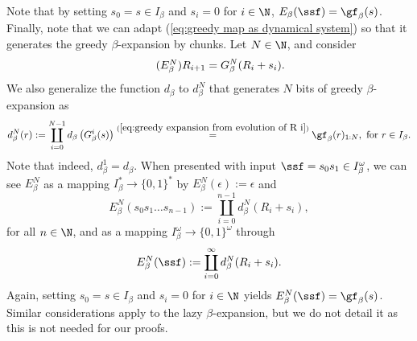 Note that by setting $s_0 = s \in I_\beta$ and $s_i = 0$ for $i \in \N$, $E_\beta(\ssf) = \gf_\beta(s)$. Finally, note that we can adapt (\ref{eq:greedy map as dynamical system}) so that it generates the greedy $\beta$-expansion by chunks. Let $N \in \N$, and consider 
\begin{equation}\label{eq:greedy map chunks as dynamical system} \tag{\text{$E^N_\beta$}}
	R_{i+1} = G_\beta^N(R_i + s_i).
\end{equation}
We also generalize the function $d_\beta$ to $d_\beta^N$ that generates $N$ bits of greedy $\beta$-expansion as
\begin{equation}\label{eq:definition multiple digit map}
	d_\beta^N(r) := \coprod_{i=0}^{N-1} d_{\beta}\left(G_\beta^{i}(s)\right) \overset{(\ref{eq:greedy expansion from evolution of R i})}{=} \gf_\beta(r)_{1:N}, \ \text{for} \ r \in I_\beta.
\end{equation}
Note that indeed, $d_\beta^1 = d_\beta$. When presented with input $\ssf = s_0s_1 \in  I_\beta^\omega$, we can see $E^N_\beta$ as a mapping $ I_\beta^\ast \to \{0,1\}^\ast$ by $E^N_\beta(\epsilon) := \epsilon$ and
\begin{equation}\label{eq:inferring prefix of chunks of greedy expansion from R i E beta}
	E^N_\beta(s_0s_1\ldots s_{n-1}) := \coprod_{i=0}^{n-1} d^N_\beta(R_i + s_i), 
\end{equation}
for all $n \in \N$, and as a mapping $I_\beta^\omega \to \{0,1\}^\omega$ through
\begin{equation}\label{eq:inferring chunks of greedy expansion from R i E beta}
	E^N_\beta(\ssf) := \coprod_{i=0}^{\infty} d^N_\beta(R_i + s_i).
\end{equation}
Again, setting $s_0 = s \in I_\beta$ and $s_i = 0$ for $i \in \N$ yields $E^N_\beta(\ssf) = \gf_\beta(s)$. Similar considerations apply to the lazy $\beta$-expansion, but we do not detail it as this is not needed for our proofs.
